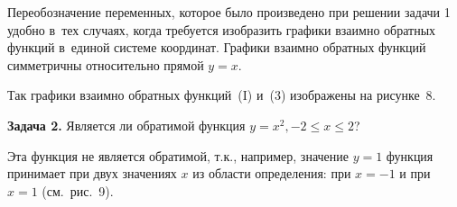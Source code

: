 Переобозначение переменных, которое было произведено при решении задачи 1 удобно
в~тех случаях, когда требуется изобразить графики взаимно обратных функций
в~единой системе координат. Графики взаимно обратных функций симметричны
относительно прямой $y = x$.

Так графики взаимно обратных функций~(I) и~(3) изображены на рисунке~8.

\textbf{Задача 2.} Является ли обратимой функция
$y = x^{2}, -2 \leqslant x \leqslant 2$?

Эта функция не является обратимой, т.к., например, значение $y = 1$
функция принимает при двух значениях $x$ из области определения:
при $x = -1$ и при $x = 1$ (см.\ рис.\ 9).

